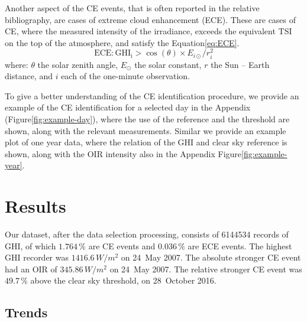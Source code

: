 \documentclass[preprint, 3p,
authoryear]{elsarticle} %
\begin{document}
Another aspect of the CE events, that is often reported in the relative
bibliography, are cases of extreme cloud enhancement (ECE). These are
cases of CE, where the measured intensity of the irradiance, exceeds the
equivalent TSI on the top of the atmosphere, and satisfy the
Equation\nobreakspace{}\ref{eq:ECE}. \begin{equation}
\text{ECE}: \text{GHI}_\text{i} > \cos(\theta) \times E_{i\odot} / r_{i}^2
\label{eq:ECE}
\end{equation} where: \(\theta\) the solar zenith angle, \(E_{\odot}\)
the solar constant, \(r\) the Sun -- Earth distance, and \(i\) each of
the one-minute observation.

To give a better understanding of the CE identification procedure, we
provide an example of the CE identification for a selected day in the
Appendix (Figure\nobreakspace{}\ref{fig:example-day}), where the use of
the reference and the threshold are shown, along with the relevant
measurements. Similar we provide an example plot of one year data, where
the relation of the GHI and clear sky reference is shown, along with the
OIR intensity also in the Appendix
Figure\nobreakspace{}\ref{fig:example-year}.

\hypertarget{results}{%
\section{Results}\label{results}}

Our dataset, after the data selection processing, consists of 6144534
records of GHI, of which \(1.764\,\%\) are CE events and \(0.036\,\%\)
are ECE events. The highest GHI recorder was \(1416.6\,W/m^2\) on 24~May
2007. The absolute stronger CE event had an OIR of \(345.86\,W/m^2\) on
24~May 2007. The relative stronger CE event was \(49.7\,\%\) above the
clear sky threshold, on 28~October 2016.

\hypertarget{trends}{%
\subsection{Trends}\label{trends}}
\end{document}
